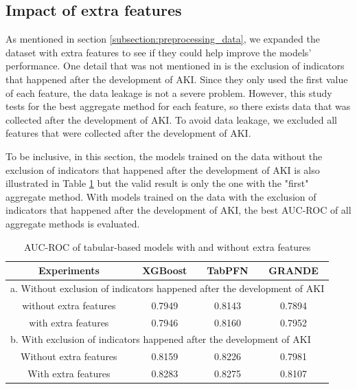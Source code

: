 \documentclass[sn-mathphys-num]{sn-jnl}%
\theoremstyle{thmstyleone}%
\theoremstyle{thmstyletwo}%
\theoremstyle{thmstylethree}%
\begin{document}
\subsection{Impact of extra features}
As mentioned in section \ref{subsection:preprocessing_data}, we expanded the dataset with extra features to see if they could help improve the models' performance. 
One detail that was not mentioned in \cite{xgboost-aki-dka} is the exclusion of indicators that happened after the development of AKI.
Since they only used the first value of each feature, the data leakage is not a severe problem.
However, this study tests for the best aggregate method for each feature, so there exists data that was collected after the development of AKI.
To avoid data leakage, we excluded all features that were collected after the development of AKI.

To be inclusive, in this section, the models trained on the data without the exclusion of indicators that happened after the development of AKI is also illustrated in Table \ref{tab:extra-features} but the valid result is only the one with the "first" aggregate method.
With models trained on the data with the exclusion of indicators that happened after the development of AKI, the best AUC-ROC of all aggregate methods is evaluated.

\begin{table}[h!]
    \centering
    \caption{AUC-ROC of tabular-based models with and without extra features}
    \label{tab:extra-features}
    \begin{tabular}{|c|c|c|c|}
        \hline
        \textbf{Experiments} & \textbf{XGBoost} & \textbf{TabPFN} &       \textbf{GRANDE} \\ \hline
        \multicolumn{4}{|l|}{a. Without exclusion of indicators happened after the development of AKI}  \\ \hline
        without extra features & 0.7949 & 0.8143 & 0.7894 \\ \hline
        with extra features & 0.7946 & 0.8160 & 0.7952 \\ \hline
        \multicolumn{4}{|l|}{b. With exclusion of indicators happened after the development of AKI}  \\ \hline
        Without extra features & 0.8159 & 0.8226 & 0.7981 \\ \hline
        With extra features & 0.8283 & 0.8275 & 0.8107 \\ \hline
    \end{tabular}
\end{table}
\end{document}
